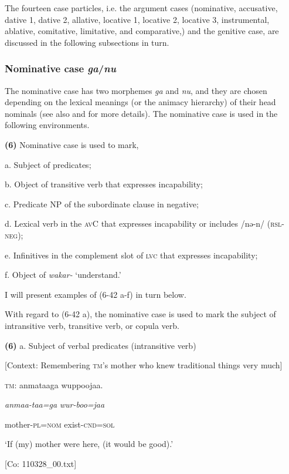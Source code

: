 The fourteen case particles, i.e. the argument cases (nominative, accusative, dative 1, dative 2, allative, locative 1, locative 2, locative 3, instrumental, ablative, comitative, limitative, and comparative,) and the genitive case, are discussed in the following subsections in turn.

\subsubsection{Nominative case \textit{ga}/\textit{nu}}
\label{bkm:Ref366360662}
The nominative case has two morphemes \textit{ga} and \textit{nu}, and they are chosen depending on the lexical meanings (or the animacy hierarchy) of their head nominals (see also  and  for more details). The nominative case is used in the following environments.

\textbf{(6)}  Nominative case is used to mark,

  a. Subject of predicates;

  b. Object of transitive verb that expresses incapability;

  c. Predicate NP of the subordinate clause in negative;

  d. Lexical verb in the \textsc{av}C that expresses incapability or includes /nə-n/ (\textsc{rsl}-\textsc{neg});

  e. Infinitives in the complement slot of \textsc{lvc} that expresses incapability;

  f. Object of \textit{wakar-} ‘understand.’

I will present examples of (6-42 a-f) in turn below.

With regard to (6-42 a), the nominative case is used to mark the subject of intransitive verb, transitive verb, or copula verb.

\textbf{(6)}  a.  Subject of verbal predicates (intransitive verb)

    [Context: Remembering \textsc{tm}’s mother who knew traditional things very much]

    \textsc{tm}:  anmataaga  wuppoojaa.

      \textit{anmaa-taa=ga}  \textit{wur-boo=jaa}

      mother-\textsc{pl}=\textsc{nom}  exist-\textsc{cnd}=\textsc{sol}

      ‘If (my) mother were here, (it would be good).’

      [Co: 110328\_00.txt]

